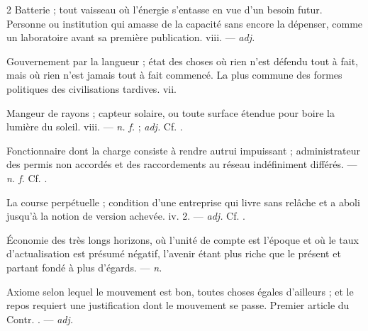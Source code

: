 \begin{multicols}{2}
  Batterie ; tout vaisseau où l'énergie s'entasse en vue d'un besoin futur.   Personne ou institution qui amasse de la capacité sans encore la dépenser, comme un laboratoire avant sa première publication.   viii. —  \textit{adj.}

 Gouvernement par la langueur ; état des choses où rien n'est défendu tout à fait, mais où rien n'est jamais tout à fait commencé. La plus commune des formes politiques des civilisations tardives.   vii.

 Mangeur de rayons ; capteur solaire, ou toute surface étendue pour boire la lumière du soleil.   viii. —  \textit{n. f.} ;  \textit{adj.} Cf. .

 Fonctionnaire dont la charge consiste à rendre autrui impuissant ; administrateur des permis non accordés et des raccordements au réseau indéfiniment différés. —  \textit{n. f.} Cf. .

 La course perpétuelle ; condition d'une entreprise qui livre sans relâche et a aboli jusqu'à la notion de version achevée.   iv. 2. —  \textit{adj.} Cf. .

 Économie des très longs horizons, où l'unité de compte est l'époque et où le taux d'actualisation est présumé négatif, l'avenir étant plus riche que le présent et partant fondé à plus d'égards. —  \textit{n.}

 Axiome selon lequel le mouvement est bon, toutes choses égales d'ailleurs ; et le repos requiert une justification dont le mouvement se passe. Premier article du  Contr. . —  \textit{adj.}


\end{multicols}
